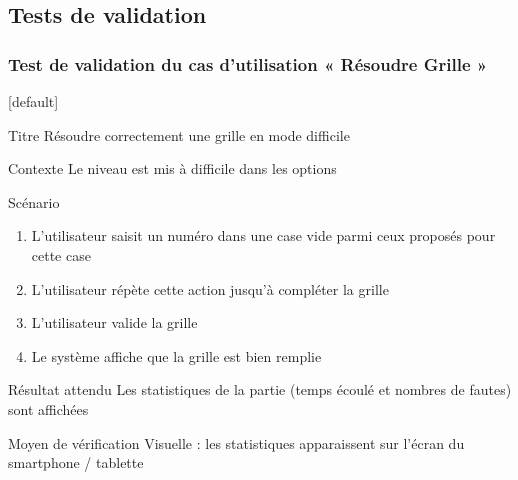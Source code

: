\documentclass{beamer}
\begin{document}
\subsection{Tests de validation}
\begin{frame}
  \frametitle{Test de validation  du cas d'utilisation « Résoudre Grille »}
  [default]
  \begin{block}{\footnotesize{Titre}}
    \scriptsize{Résoudre correctement une grille en mode difficile}
  \end{block}
  \pause
  \begin{block}{\footnotesize{Contexte}}
    \scriptsize{Le niveau est mis à difficile dans les options}
  \end{block}
  \pause
  \begin{block}{\footnotesize{Scénario}}
    \begin{enumerate}
      [circle]
      \item
        \scriptsize{L'utilisateur saisit un numéro dans une case vide parmi ceux proposés pour cette case}
      \item
        \scriptsize{L’utilisateur répète cette action jusqu’à compléter la grille}
      \item
        \scriptsize{L’utilisateur valide la grille}
      \item
        \scriptsize{Le système affiche que la grille est bien remplie} 
    \end{enumerate}
  \end{block}
  \pause
  \begin{block}{\footnotesize{Résultat attendu}}
    \scriptsize{Les statistiques de la partie (temps écoulé et nombres de fautes) sont affichées}
  \end{block}
  \begin{block}{\footnotesize{Moyen de vérification}}
    \scriptsize{Visuelle : les statistiques apparaissent sur l’écran du smartphone / tablette}
  \end{block}
\end{frame}
\end{document}
